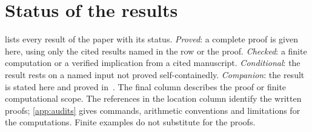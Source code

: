 \section{Status of the results}\label{app:status}

 lists every result of the paper with its status. \emph{Proved}: a complete proof is given here, using
only the cited results named in the row or the proof. \emph{Checked}: a finite computation or a verified implication from a cited
manuscript. \emph{Conditional}: the result rests on a named input not proved self-containedly. \emph{Companion}: the result is stated
here and proved in~\cite{DM-game}. The final column describes the proof or finite computational scope. The references in the location column identify the written proofs; \cref{app:audits} gives commands, arithmetic conventions and limitations for the computations. Finite examples do not substitute for the proofs.

